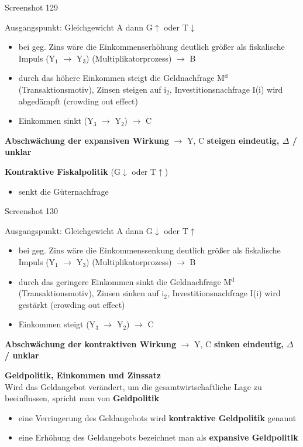 \documentclass[11pt]{article}
\begin{document}
\begin{enumerate}
Screenshot 129

Ausgangspunkt: Gleichgewicht A dann G\(\uparrow\) oder T\(\downarrow\)
\begin{itemize}
\item bei geg. Zins wäre die Einkommenserhöhung deutlich größer als fiskalische Impuls (Y\(_{\text{1}}\) \(\rightarrow\) Y\(_{\text{3}}\)) (Multiplikatorprozess) \(\rightarrow\) B
\item durch das höhere Einkommen steigt die Geldnachfrage M\(^{\text{d}}\) (Transaktionsmotiv), Zinsen steigen auf i\(_{\text{2}}\), Investitionsnachfrage I(i) wird abgedämpft (crowding out effect)
\item Einkommen sinkt (Y\(_{\text{3}}\) \(\rightarrow\) Y\(_{\text{2}}\)) \(\rightarrow\) C
\end{itemize}

\textbf{Abschwächung der expansiven Wirkung} \(\rightarrow\) Y, C \textbf{steigen eindeutig, \(\Delta\) / unklar}

\textbf{Kontraktive Fiskalpolitik} (G\(\downarrow\) oder T\(\uparrow\))\\
\begin{itemize}
\item senkt die Güternachfrage
\end{itemize}

Screenshot 130

Ausgangspunkt: Gleichgewicht A dann G\(\downarrow\) oder T\(\uparrow\)
\begin{itemize}
\item bei geg. Zins wäre die Einkommenssenkung deutlich größer als fiskalische Impuls (Y\(_{\text{1}}\) \(\rightarrow\) Y\(_{\text{3}}\)) (Multiplikatorprozess) \(\rightarrow\) B
\item durch das geringere Einkommen sinkt die Geldnachfrage M\(^{\text{d}}\) (Transaktionsmotiv), Zinsen sinken auf i\(_{\text{2}}\), Investitionsnachfrage I(i) wird gestärkt (crowding out effect)
\item Einkommen steigt (Y\(_{\text{3}}\) \(\rightarrow\) Y\(_{\text{2}}\)) \(\rightarrow\) C
\end{itemize}

\textbf{Abschwächung der kontraktiven Wirkung} \(\rightarrow\) Y, C \textbf{sinken eindeutig, \(\Delta\) / unklar}

\textbf{Geldpolitik, Einkommen und Zinssatz}\\
Wird das Geldangebot verändert, um die gesamtwirtschaftliche Lage zu beeinflussen, spricht man von \textbf{Geldpolitik}
\begin{itemize}
\item eine Verringerung des Geldangebots wird \textbf{kontraktive Geldpolitik} genannt
\item eine Erhöhung des Geldangebots bezeichnet man als \textbf{expansive Geldpolitik}
\end{itemize}


\end{enumerate}
\end{document}
